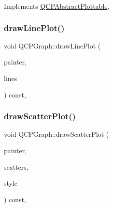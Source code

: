 Implements \hyperlink{class_q_c_p_abstract_plottable_a9a450783fd9ed539e589999fd390cdf7}{Q\+C\+P\+Abstract\+Plottable}.

\mbox{\label{class_q_c_p_graph_a4c3edacb2a11064bf2e16b322156aeda}} 
\subsubsection{\texorpdfstring{draw\+Line\+Plot()}{drawLinePlot()}}
{\footnotesize\ttfamily void Q\+C\+P\+Graph\+::draw\+Line\+Plot (\begin{DoxyParamCaption}\item[{\hyperlink{class_q_c_p_painter}{Q\+C\+P\+Painter} $\ast$}]{painter,  }\item[{const Q\+Vector$<$ Q\+PointF $>$ \&}]{lines }\end{DoxyParamCaption}) const\hspace{0.3cm}{\ttfamily [protected]}, {\ttfamily [virtual]}}

\mbox{\label{class_q_c_p_graph_abeb0bbe81026c024bf3d508d13cf5e0e}} 
\subsubsection{\texorpdfstring{draw\+Scatter\+Plot()}{drawScatterPlot()}}
{\footnotesize\ttfamily void Q\+C\+P\+Graph\+::draw\+Scatter\+Plot (\begin{DoxyParamCaption}\item[{\hyperlink{class_q_c_p_painter}{Q\+C\+P\+Painter} $\ast$}]{painter,  }\item[{const Q\+Vector$<$ Q\+PointF $>$ \&}]{scatters,  }\item[{const \hyperlink{class_q_c_p_scatter_style}{Q\+C\+P\+Scatter\+Style} \&}]{style }\end{DoxyParamCaption}) const\hspace{0.3cm}{\ttfamily [protected]}, {\ttfamily [virtual]}}

\mbox{\label{class_q_c_p_graph_aaabd6c6a7200a2672c44e62bd2a1cafa}} 
